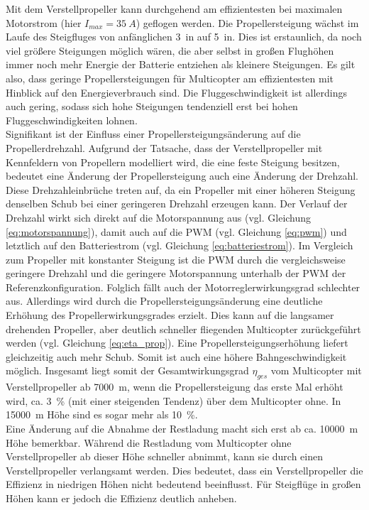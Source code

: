 Mit dem Verstellpropeller kann durchgehend am effizientesten bei maximalen Motorstrom (hier \ensuremath{I_{max} = \SI{35}{A}}) geflogen werden. Die Propellersteigung wächst im Laufe des Steigfluges von anfänglichen \SI{3}{in} auf \SI{5}{in}. Dies ist erstaunlich, da noch viel größere Steigungen möglich wären, die aber selbst in großen Flughöhen immer noch mehr Energie der Batterie entziehen als kleinere Steigungen. Es gilt also, dass geringe Propellersteigungen für Multicopter am effizientesten mit Hinblick auf den Energieverbrauch sind. Die Fluggeschwindigkeit ist allerdings auch gering, sodass sich hohe Steigungen tendenziell erst bei hohen Fluggeschwindigkeiten lohnen. \\
Signifikant ist der Einfluss einer Propellersteigungsänderung auf die Propellerdrehzahl. Aufgrund der Tatsache, dass der Verstellpropeller mit Kennfeldern von Propellern modelliert wird, die eine feste Steigung besitzen, bedeutet eine Änderung der Propellersteigung auch eine Änderung der Drehzahl. Diese Drehzahleinbrüche treten auf, da ein Propeller mit einer höheren Steigung denselben Schub bei einer geringeren Drehzahl erzeugen kann. Der Verlauf der Drehzahl wirkt sich direkt auf die Motorspannung aus (vgl. Gleichung \eqref{eq:motorspannung}), damit auch auf die PWM (vgl. Gleichung \eqref{eq:pwm}) und letztlich auf den Batteriestrom (vgl. Gleichung \eqref{eq:batteriestrom}). Im Vergleich zum Propeller mit konstanter Steigung ist die PWM durch die vergleichsweise geringere Drehzahl und die geringere Motorspannung unterhalb der PWM der Referenzkonfiguration. Folglich fällt auch der Motorreglerwirkungsgrad schlechter aus. Allerdings wird durch die Propellersteigungsänderung eine deutliche Erhöhung des Propellerwirkungsgrades erzielt. Dies kann auf die langsamer drehenden Propeller, aber deutlich schneller fliegenden Multicopter zurückgeführt werden (vgl. Gleichung \eqref{eq:eta_prop}). Eine Propellersteigungserhöhung liefert gleichzeitig auch mehr Schub. Somit ist auch eine höhere Bahngeschwindigkeit möglich. Insgesamt liegt somit der Gesamtwirkungsgrad \ensuremath{\eta_{ges}} vom Multicopter mit Verstellpropeller ab \SI{7000}{m}, wenn die Propellersteigung das erste Mal erhöht wird, ca. \SI{3}{\%} (mit einer steigenden Tendenz) über dem Multicopter ohne. In \SI{15000}{m} Höhe sind es sogar mehr als \SI{10}{\%}. \\
Eine Änderung auf die Abnahme der Restladung macht sich erst ab ca. \SI{10000}{m} Höhe bemerkbar. Während die Restladung vom Multicopter ohne Verstellpropeller ab dieser Höhe schneller abnimmt, kann sie durch einen Verstellpropeller verlangsamt werden. Dies bedeutet, dass ein Verstellpropeller die Effizienz in niedrigen Höhen nicht bedeutend beeinflusst. Für Steigflüge in großen Höhen kann er jedoch die Effizienz deutlich anheben.
